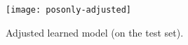 \begin{answer}
	\begin{figure}[H]
		\centering
		\texttt{[image: posonly-adjusted]}
		\caption{Adjusted learned model (on the test set).}
	\end{figure}
\end{answer}
